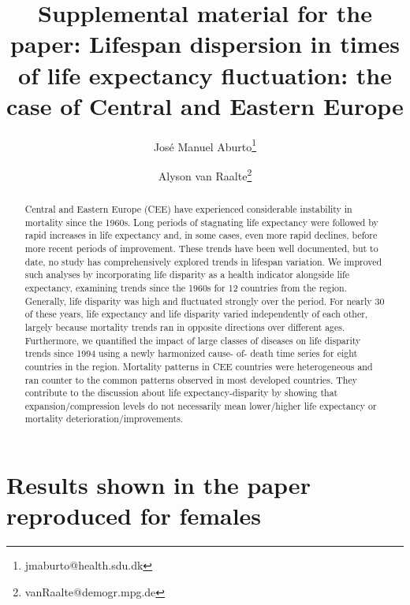 \documentclass{article}
\title{Supplemental material for the paper: Lifespan dispersion in times of life expectancy fluctuation: the case of Central and Eastern Europe}
\author[1,2]{Jos\'e Manuel Aburto\thanks{jmaburto@health.sdu.dk}}
\author[2]{Alyson van Raalte\thanks{vanRaalte@demogr.mpg.de}}
\affil[1]{University of Southern Denmark}
\affil[2]{Max Planck Institute for Demographic Research}
\date{}
\begin{document}
\maketitle

\begin{abstract}
Central and Eastern Europe (CEE) have experienced considerable instability in mortality since the 1960s. Long periods of stagnating life expectancy were followed by rapid increases in life expectancy and, in some cases, even more rapid declines, before more recent periods of improvement. These trends have been well documented, but to date, no study has comprehensively explored trends in lifespan variation. We improved such analyses by incorporating life disparity as a health indicator alongside life expectancy, examining trends since the 1960s for 12 countries from the region. Generally, life disparity was high and fluctuated strongly over the period. For nearly 30 of these years, life expectancy and life disparity  varied independently of each other, largely because mortality trends ran in opposite directions over different ages. Furthermore, we quantified the impact of large classes of diseases on life disparity trends since 1994 using a newly harmonized cause- of- death time series for eight countries in the region. Mortality patterns in CEE countries were heterogeneous and ran counter to the common patterns observed in most developed countries. They contribute to the discussion about life expectancy-disparity by showing that expansion/compression levels do not necessarily mean lower/higher life expectancy or mortality deterioration/improvements.
\end{abstract}


\newpage


\section*{Results shown in the paper reproduced for females}
\end{document}
